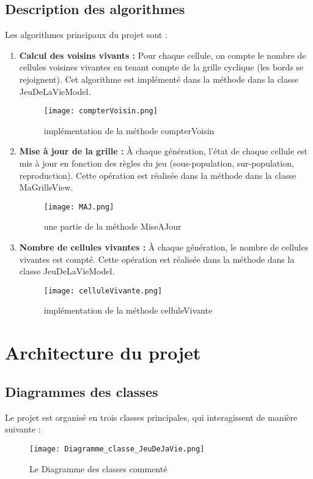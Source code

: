 \documentclass[a4paper,12pt]{article}
\begin{document}
\subsection{Description des algorithmes}
Les algorithmes principaux du projet sont :
\begin{enumerate}
    \item \textbf{Calcul des voisins vivants :}
    Pour chaque cellule, on compte le nombre de cellules voisines vivantes en tenant compte de la grille cyclique (les bords se rejoignent). Cet algorithme est implémenté dans la méthode  dans la classe JeuDeLaVieModel.
    \begin{figure}[H]
        \centering
        \texttt{[image: compterVoisin.png]}
        \caption{implémentation de la méthode compterVoisin}
    \end{figure}
    \item \textbf{Mise à jour de la grille :} À chaque génération, l'état de chaque cellule est mis à jour en fonction des règles du jeu (sous-population, sur-population, reproduction). Cette opération est réalisée dans la méthode  dans la classe MaGrilleView.
     \begin{figure}[H]
        \centering
        \texttt{[image: MAJ.png]}
        \caption{une partie de la méthode MiseAJour}
    \end{figure}
    \item \textbf{Nombre de cellules vivantes :} À chaque génération, le nombre de cellules vivantes est compté. Cette opération est réalisée dans la méthode  dans la classe JeuDeLaVieModel.
     \begin{figure}[H]
        \centering
        \texttt{[image: celluleVivante.png]}
        \caption{implémentation de la méthode celluleVivante}
    \end{figure}
    \end{enumerate}
    \section{Architecture du projet}
    \subsection{Diagrammes des classes}
    Le projet est organisé en trois classes principales, qui interagissent de manière suivante :
    \begin{figure}[H]
        \centering
        \texttt{[image: Diagramme\_classe\_JeuDeJaVie.png]}
        \caption{Le Diagramme des classes commenté}
    \end{figure}
\end{document}
